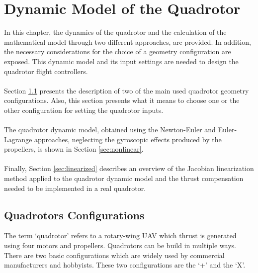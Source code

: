 \chapter{Dynamic Model of the Quadrotor \label{ch:model}}

In this chapter, the dynamics of the quadrotor and the calculation of the mathematical model through two different approaches, are provided. In addition, the necessary considerations for the choice of a geometry configuration are exposed. This dynamic model and its input settings are needed to design the quadrotor flight controllers.
\\\\
Section \ref{sec:configurations} presents the description of two of the main used quadrotor geometry configurations. Also, this section presents what it means to choose one or the other configuration for setting the quadrotor inputs.
\\\\
The quadrotor dynamic model, obtained using the Newton-Euler and Euler-Lagrange approaches, neglecting the gyroscopic effects produced by the propellers, is shown in Section \ref{sec:nonlinear}.
\\\\
Finally, Section \ref{sec:linearized} describes an overview of the Jacobian linearization method applied to the quadrotor dynamic model and the thrust compensation needed to be implemented in a real quadrotor.

\section{Quadrotors Configurations}
\label{sec:configurations}
The term `quadrotor' refers to a rotary-wing UAV which thrust is generated using four motors and propellers. Quadrotors can be build in multiple ways.
There are two basic configurations which are widely used by commercial manufacturers and hobbyists. These two configurations are the `+' and the `X'.


